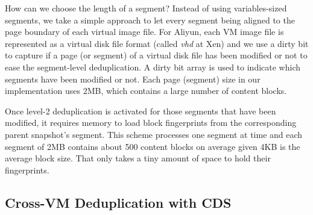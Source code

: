 How can we choose the length of a segment?
Instead of using variables-sized segments, we take a simple approach
to let every segment being aligned to the page boundary of each virtual image file.
For Aliyun, each VM image file is represented as a virtual disk file format
(called \emph{vhd} at Xen) and we use a dirty bit to capture if a page (or segment) of a virtual disk file 
has been modified or not to ease the segment-level deduplication.
A dirty bit array is used to indicate which segments have been modified or not. 
Each page (segment) size in our implementation uses 2MB, which contains a large number of content blocks.






Once level-2 deduplication is activated for those segments that have been modified,
it requires memory to load  block fingerprints from the corresponding
parent snapshot's segment.
This scheme processes one segment at time and each segment of 2MB contains about 
500 content blocks on average given 4KB is the average block size.
That only takes a tiny amount of space to hold their fingerprints.

\subsection{Cross-VM Deduplication with CDS}
\label{sect:crossVM}

